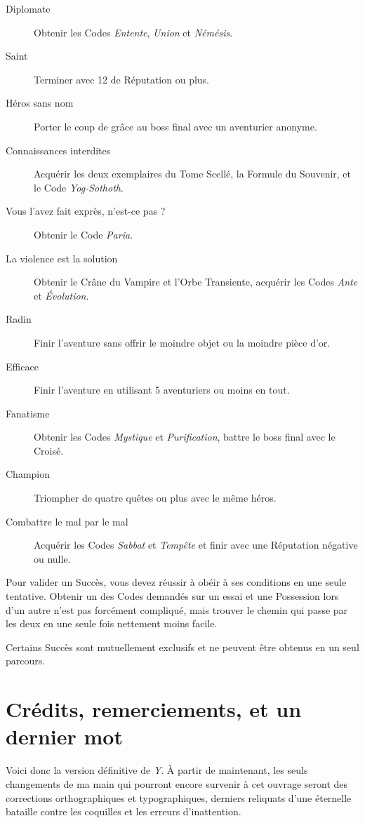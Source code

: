 \documentclass{report}
\begin{document}
\begin{description}
\item[Diplomate] Obtenir les Codes \emph{Entente}, \emph{Union} et \emph{Némésis}.
\item[Saint] Terminer avec 12 de Réputation ou plus.
\item[Héros sans nom] Porter le coup de grâce au boss final avec un aventurier anonyme.
\item[Connaissances interdites] Acquérir les deux exemplaires du Tome Scellé, la Formule du Souvenir, et le Code \emph{Yog-Sothoth}.
\item[Vous l'avez fait exprès, n'est-ce pas ?] Obtenir le Code \emph{Paria}.
\item[La violence est la solution] Obtenir le Crâne du Vampire et l'Orbe Transiente, acquérir les Codes \emph{Ante} et \emph{Évolution}.
\item[Radin] Finir l'aventure sans offrir le moindre objet ou la moindre pièce d'or.
\item[Efficace] Finir l'aventure en utilisant 5 aventuriers ou moins en tout.
\item[Fanatisme] Obtenir les Codes \emph{Mystique} et \emph{Purification}, battre le boss final avec le Croisé.
\item[Champion] Triompher de quatre quêtes ou plus avec le même héros.
\item[Combattre le mal par le mal] Acquérir les Codes \emph{Sabbat} et \emph{Tempête} et finir avec une Réputation négative ou nulle.
\end{description}

Pour valider un Succès, vous devez réussir à obéir à ses conditions en une seule tentative. Obtenir un des Codes demandés sur un essai et une Possession lors d'un autre n'est pas forcément compliqué, mais trouver le chemin qui passe par les deux en une seule fois nettement moins facile.

Certains Succès sont mutuellement exclusifs et ne peuvent être obtenus en un seul parcours.

\chapter{Crédits, remerciements, et un dernier mot}

Voici donc la version définitive de \emph{Y}. À partir de maintenant, les seuls changements de ma main qui pourront encore survenir à cet ouvrage seront des corrections orthographiques et typographiques, derniers reliquats d'une éternelle bataille contre les coquilles et les erreurs d'inattention.
\end{document}
